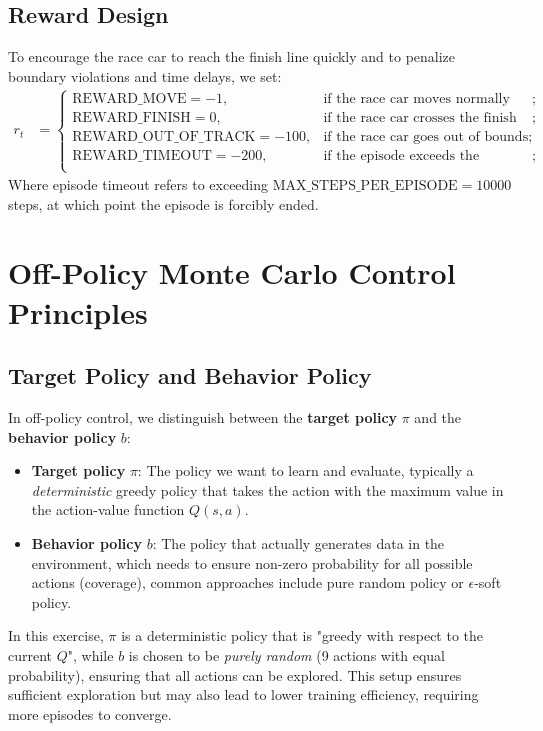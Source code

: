 \documentclass{article}
\begin{document}
\subsection{Reward Design}
To encourage the race car to reach the finish line quickly and to penalize boundary violations and time delays, we set:
\[
\begin{aligned}
r_t &= 
\begin{cases}
\text{REWARD\_MOVE} = -1, & \text{if the race car moves normally within the track};\\
\text{REWARD\_FINISH} = 0, & \text{if the race car crosses the finish line};\\
\text{REWARD\_OUT\_OF\_TRACK} = -100, & \text{if the race car goes out of bounds};\\
\text{REWARD\_TIMEOUT} = -200, & \text{if the episode exceeds the maximum step limit};\\
\end{cases}
\end{aligned}
\]
Where episode timeout refers to exceeding \(\text{MAX\_STEPS\_PER\_EPISODE} = 10000\) steps, at which point the episode is forcibly ended.

\section{Off-Policy Monte Carlo Control Principles}
\subsection{Target Policy and Behavior Policy}
In off-policy control, we distinguish between the \textbf{target policy} \(\pi\) and the \textbf{behavior policy} \(b\):
\begin{itemize}
    \item \textbf{Target policy} \(\pi\): The policy we want to learn and evaluate, typically a \emph{deterministic} greedy policy that takes the action with the maximum value in the action-value function \(Q(s,a)\).
    \item \textbf{Behavior policy} \(b\): The policy that actually generates data in the environment, which needs to ensure non-zero probability for all possible actions (coverage), common approaches include pure random policy or $\epsilon$-soft policy.
\end{itemize}

In this exercise, \(\pi\) is a deterministic policy that is "greedy with respect to the current \(Q\)", while \(b\) is chosen to be \emph{purely random} (9 actions with equal probability), ensuring that all actions can be explored. This setup ensures sufficient exploration but may also lead to lower training efficiency, requiring more episodes to converge.
\end{document}
